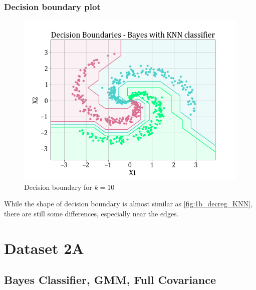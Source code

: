\documentclass[11pt,a4paper]{article}
\begin{document}
\subsubsection{Decision boundary plot}
\begin{figure}[H]
    \centering
    \includegraphics[scale=0.7]{images/1B/1b_nb_decision_region.png}
    \caption{Decision boundary for $k=10$}
    \label{fig:1b_decreg_nb}
\end{figure}
While the shape of decision boundary is almost similar as \autoref{fig:1b_decreg_KNN}, there are still some differences, especially near the edges.

\break
\section{Dataset 2A}
\subsection{Bayes Classifier, GMM, Full Covariance}
\end{document}
